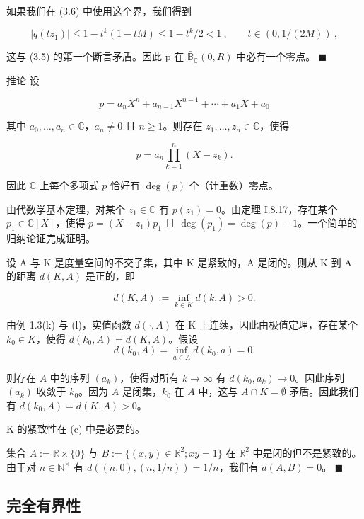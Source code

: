 \begin{example}
\begin{items}
\begin{subitems}
如果我们在 (3.6) 中使用这个界，我们得到

\[
|q(t z_{1})|\leq1-t^{k}(1-t M)\leq1-t^{k}/2<1~,\qquad t\in\left(0,1/(2M)\right)~,
\]

这与 (3.5) 的第一个断言矛盾。因此 p 在 $ \bar{\mathbb{B}}_{\mathbb{C}}(0, R) $ 中必有一个零点。 $ \blacksquare $

\end{subitems}

推论 设

\[
p=a_{n}X^{n}+a_{n-1}X^{n-1}+\cdots+a_{1}X+a_{0}
\]

其中 $ a_0, \ldots, a_n \in \mathbb{C} $，$ a_n \neq 0 $ 且 $ n \geq 1 $。则存在 $ z_1, \ldots, z_n \in \mathbb{C} $，使得

\[
p=a_{n}\prod_{k=1}^{n}(X-z_{k}).
\]

因此 $\mathbb{C}$ 上每个多项式 $p$ 恰好有 $\deg(p)$ 个（计重数）零点。

\proofhead
由代数学基本定理，对某个 $ z_1 \in \mathbb{C} $ 有 $ p(z_1) = 0 $。由定理 I.8.17，存在某个 $ p_1 \in \mathbb{C}[X] $，使得 $ p = (X - z_1)p_1 $ 且 $ \deg(p_1) = \deg(p) - 1 $。一个简单的归纳论证完成证明。
\item

设 A 与 K 是度量空间的不交子集，其中 K 是紧致的，A 是闭的。则从 K 到 A 的距离 $ d(K, A) $ 是正的，即

\[
d(K,A):=\inf_{k\in K}d(k,A)>0.
\]

\proofhead
由例 1.3(k) 与 (l)，实值函数 $ d(\cdot, A) $ 在 K 上连续，因此由极值定理，存在某个 $ k_0 \in K $，使得 $ d(k_0, A) = d(K, A) $。假设
\[
d(k_{0},A)=\inf_{a\in A}d(k_{0},a)=0.
\]

则存在 $A$ 中的序列 $(a_k)$，使得对所有 $k \to \infty$ 有 $d(k_0, a_k) \to 0$。因此序列 $(a_k)$ 收敛于 $k_0$。因为 $A$ 是闭集，$k_0$ 在 $A$ 中，这与 $A \cap K = \emptyset$ 矛盾。因此我们有 $d(k_0, A) = d(K, A) > 0$。

\item

K 的紧致性在 (c) 中是必要的。

\proofhead
集合 $ A := \mathbb{R} \times \{0\} $ 与 $ B := \{(x, y) \in \mathbb{R}^2; xy = 1\} $ 在 $ \mathbb{R}^2 $ 中是闭的但不是紧致的。由于对 $ n \in \mathbb{N}^\times $ 有 $ d((n,0), (n,1/n)) = 1/n $，我们有 $ d(A, B) = 0 $。 $ \blacksquare $
\end{items}

\end{example}

\subsection*{完全有界性}

